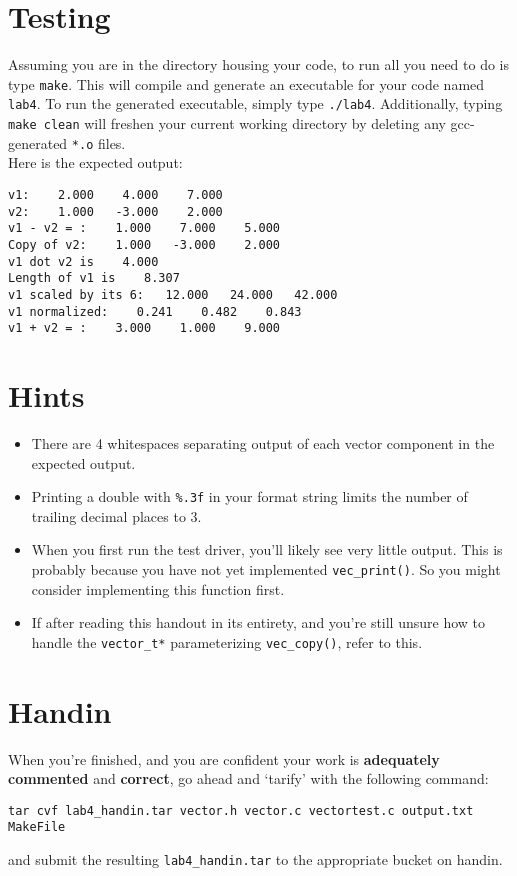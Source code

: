 \documentclass[12pt]{article}
\begin{document}
\section{Testing}

Assuming you are in the directory housing your code, to run all you need to do is type \texttt{make}. This will compile and generate an executable for your code named \texttt{lab4}. To run the generated executable, simply type \texttt{./lab4}. Additionally, typing \texttt{make clean} will freshen your current working directory by deleting any gcc-generated \texttt{*.o} files. \\

\noindent Here is the expected output:

\begin{mdframed}[backgroundcolor=light-gray, innerleftmargin=10, innertopmargin=1,innerbottommargin=1,linecolor=light-gray]
\begin{lstlisting}
v1:    2.000    4.000    7.000
v2:    1.000   -3.000    2.000
v1 - v2 = :    1.000    7.000    5.000
Copy of v2:    1.000   -3.000    2.000
v1 dot v2 is    4.000 
Length of v1 is    8.307 
v1 scaled by its 6:   12.000   24.000   42.000
v1 normalized:    0.241    0.482    0.843
v1 + v2 = :    3.000    1.000    9.000
\end{lstlisting}
\end{mdframed} 

\section{Hints}
\begin{itemize}
\item There are 4 whitespaces separating output of each vector component in the expected output.
\item Printing a double with \texttt{\%.3f} in your format string limits the number of trailing decimal places to 3.
\item When you first run the test driver, you'll likely see very little output. This is probably because you have not yet implemented \texttt{vec\_print()}. So you might consider implementing this function first.
\item If after reading this handout in its entirety, and you're still unsure how to handle the \texttt{vector\_t*} parameterizing \texttt{vec\_copy()}, refer to this.
\end{itemize}

\section{Handin}

When you're finished, and you are confident your work is \textbf{adequately commented} and \textbf{correct}, go ahead and `tarify' with the following command:
\begin{center}
\texttt{tar cvf lab4\_handin.tar vector.h vector.c vectortest.c output.txt MakeFile}
\end{center}
\noindent and submit the resulting \texttt{lab4\_handin.tar} to the appropriate bucket on handin.
\end{document}
